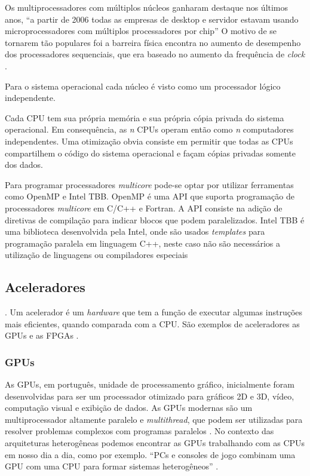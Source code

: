 Os multiprocessadores com múltiplos núcleos ganharam destaque nos últimos anos, “a partir de 2006 todas as empresas de desktop e servidor estavam usando microprocessadores com múltiplos processadores por chip” \cite[p.~31]{hennessy2014organizaccao}
O motivo de se tornarem tão populares foi a barreira física encontra no aumento de desempenho dos processadores sequenciais, que era baseado no aumento da frequência de \textit{clock} \cite{hennessy2014organizaccao}.

Para o sistema operacional cada núcleo é visto como um processador lógico independente.

\begin{citacao}
Cada CPU tem sua própria memória e sua própria cópia privada do sistema operacional.
Em consequência, as \emph{n} CPUs operam então como \emph{n} computadores independentes.
Uma otimização obvia consiste em permitir que todas as CPUs compartilhem o código do sistema operacional e façam cópias privadas somente dos dados. \cite[p.~331]{tanenbaum20103a}
\end{citacao}

Para programar processadores \textit{multicore} pode-se optar por utilizar ferramentas como OpenMP e Intel TBB.
OpenMP é uma API que suporta programação de processadores \textit{multicore} em C/C++ e Fortran.
A API consiste na adição de diretivas de compilação para indicar blocos que podem paralelizados.
Intel TBB é uma biblioteca desenvolvida pela Intel, onde são usados \textit{templates} para programação paralela em linguagem C++,
neste caso não são necessários a utilização de linguagens ou compiladores especiais

\subsection{Aceleradores}.
Um acelerador é um \textit{hardware} que tem a função de executar algumas instruções mais eficientes,
quando comparada com a CPU. São exemplos de aceleradores as GPUs e as FPGAs \cite{kindratenko2010high}.

\subsubsection{GPUs}
As GPUs, em português, unidade de processamento gráfico, inicialmente foram desenvolvidas para ser um processador otimizado para gráficos 2D e 3D, vídeo,
computação visual e exibição de dados.
As GPUs modernas são um multiprocessador altamente paralelo e \textit{multithread}, que podem ser utilizadas para resolver problemas complexos com programas paralelos \cite{hennessy2014organizaccao}.
No contexto das arquiteturas heterogêneas podemos encontrar as GPUs trabalhando com as CPUs em nosso dia a dia, como por exemplo.
“PCs e consoles de jogo combinam uma GPU com uma CPU para formar sistemas heterogêneos” \cite[p.~A-569]{hennessy2014organizaccao}.


